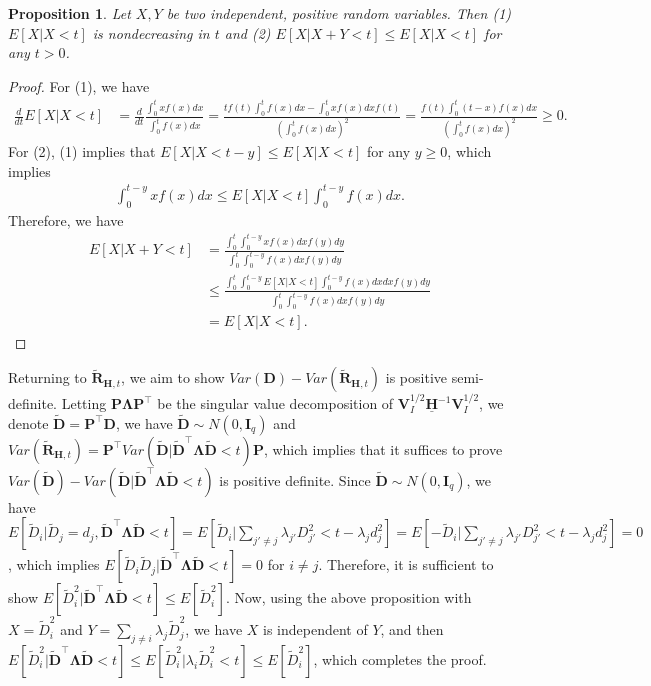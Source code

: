 \documentclass[12pt]{article}
\newtheorem{proposition}{Proposition}
\newcommand{\bR}{\boldsymbol{R}}
\newcommand{\bD}{\boldsymbol{D}}
\newcommand{\bfV}{\mathbf{V}}
\newcommand{\bfI}{\mathbf{I}}
\newcommand{\bfH}{\mathbf{H}}
\begin{document}
\begin{proposition}
    Let $X, Y$ be two independent, positive random variables. Then (1) $E[X|X<t]$ is nondecreasing in $t$ and (2) $E[X|X+Y<t] \le E[X|X<t]$ for any $t >0$.
\end{proposition}
\begin{proof}
For (1), we have
\begin{align*}
    \frac{d}{dt}E[X|X<t] &= \frac{d}{dt} \frac{\int_{0}^t x f(x)dx}{\int_{0}^t  f(x)dx} = \frac{tf(t)\int_{0}^t  f(x)dx - \int_{0}^t x f(x)dx f(t)}{\left(\int_{0}^t  f(x)dx\right)^2} = \frac{f(t)\int_{0}^t  (t-x)f(x)dx}{\left(\int_{0}^t  f(x)dx\right)^2} \ge 0.
\end{align*}
For (2), (1) implies that $E[X|X<t-y] \le E[X|X<t]$ for any $y \ge0$, which implies
\begin{align*}
    \int_{0}^{t-y} x f(x) dx \le E[X|X<t] \int_{0}^{t-y} f(x) dx.
\end{align*}
Therefore, we have
\begin{align*}
    E[X|X+Y<t] &= \frac{\int_{0}^t \int_{0}^{t-y} x f(x) dx f(y) dy}{\int_{0}^t \int_{0}^{t-y}  f(x) dx f(y) dy} \\
    &\le \frac{\int_{0}^t \int_{0}^{t-y} E[X|X<t] \int_{0}^{t-y} f(x) dx dx f(y) dy}{\int_{0}^t \int_{0}^{t-y}  f(x) dx f(y) dy} \\
    &= E[X|X<t].
\end{align*}
\end{proof}
Returning to $\widetilde{\bR}_{\bfH,t}$, we aim to show $Var(\bD)-Var(\widetilde{\bR}_{\bfH,t})$ is positive semi-definite. Letting $\mathbf{P}\mathbf{\Lambda}\mathbf{P}^\top$ be the singular value decomposition of $\bfV_{I}^{1/2} \underline{\bfH}^{-1} \bfV_{I}^{1/2}$, we denote $\widetilde{\bD} = \mathbf{P}^\top \bD$, we have $\widetilde{\bD} \sim N(0,\bfI_q)$ and  $Var(\widetilde{\bR}_{\bfH,t}) = \mathbf{P}^\top Var(\widetilde{\bD}| \widetilde{\bD}^\top \mathbf{\Lambda}\widetilde{\bD} < t)\mathbf{P}$, which implies that it suffices to prove $Var(\widetilde{\bD}) - Var(\widetilde{\bD}| \widetilde{\bD}^\top \mathbf{\Lambda}\widetilde{\bD} < t)$ is positive definite. 
Since $\widetilde{\bD} \sim N(0,\bfI_q)$, we have $E[\widetilde{D}_i|\widetilde{D}_j= d_j, \widetilde{\bD}^\top \mathbf{\Lambda}\widetilde{\bD} < t] = E[\widetilde{D}_i|\sum_{j'\ne j} \lambda_{j'} D_{j'}^2 < t - \lambda_j d_j^2] = E[-\widetilde{D}_i|\sum_{j'\ne j} \lambda_{j'} D_{j'}^2 < t - \lambda_j d_j^2] = 0$, which implies $E[\widetilde{D}_i\widetilde{D}_j|\widetilde{\bD}^\top \mathbf{\Lambda}\widetilde{\bD} < t] = 0$ for $i\ne j$.  Therefore, it is sufficient to show $E[\widetilde{D}_i^2|\widetilde{\bD}^\top \mathbf{\Lambda}\widetilde{\bD} < t] \le E[\widetilde{D}_i^2]$. Now, using the above proposition with $X = \widetilde{D}_i^2$ and $Y = \sum_{j\ne i} \lambda_j \widetilde{D}_j^2$, we have $X$ is independent of $Y$, and then $E[\widetilde{D}_i^2|\widetilde{\bD}^\top \mathbf{\Lambda}\widetilde{\bD} < t] \le E[\widetilde{D}_i^2|\lambda_i\widetilde{D}_i^2<t] \le E[\widetilde{D}_i^2]$, which completes the proof.
\end{document}
